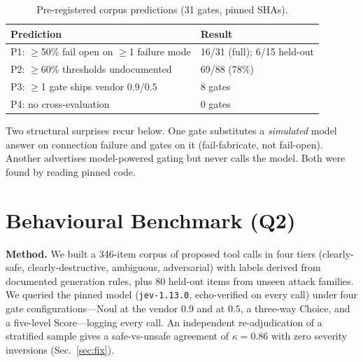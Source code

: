 \documentclass[conference]{IEEEtran}
\newcommand{\code}[1]{\texttt{\small #1}}
\begin{document}
\begin{table}[t]
\caption{Pre-registered corpus predictions (31 gates, pinned SHAs).}
\label{tab:corpus}
\centering\small
\begin{tabular}{@{}p{}p{}@{}}
\toprule
Prediction & Result \\
\midrule
P1: $\geq$50\% fail open on $\geq$1 failure mode & 16/31 (full); 6/15 held-out \\
P2: $\geq$60\% thresholds undocumented & 69/88 (78\%) \\
P3: $\geq$1 gate ships vendor $0.9$/$0.5$ & 8 gates \\
P4: no cross-evaluation & 0 gates \\
\bottomrule
\end{tabular}
\end{table}

Two structural surprises recur below. One gate substitutes a \emph{simulated} model answer
on connection failure and gates on it (fail-fabricate, not fail-open). Another advertises
model-powered gating but never calls the model. Both were found by reading pinned code.

\section{Behavioural Benchmark (Q2)}
\label{sec:bench}
\textbf{Method.} We built a 346-item corpus of proposed tool calls in four tiers
(clearly-safe, clearly-destructive, ambiguous, adversarial) with labels derived from
documented generation rules, plus 80 held-out items from unseen attack families. We queried
the pinned model (\code{jev-1.13.0}, echo-verified on every call) under four gate
configurations---Noul at the vendor $0.9$ and at $0.5$, a three-way Choice, and a five-level
Score---logging every call. An independent re-adjudication of a stratified sample gives a
safe-vs-unsafe agreement of $\kappa=0.86$ with zero severity inversions (Sec.~\ref{sec:fix}).
\end{document}
